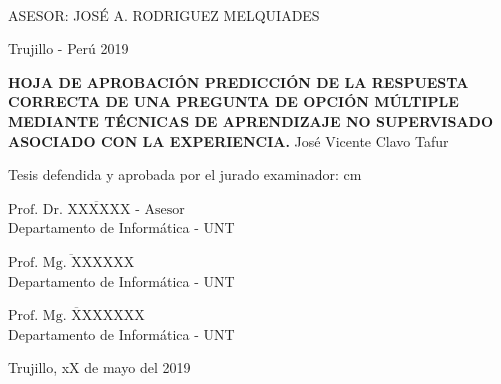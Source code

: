 \begin{center}
   {\bf {\fontsize{14}{16.8}\selectfont{José Vicente Clavo Tafur}}}\\     
   \end{center}   

\vskip 3.2cm
\begin{center}
   {\bf \doublespacing {\fontsize{17}{20.4}\selectfont{PREDICCIÓN DE LA RESPUESTA CORRECTA DE UNA PREGUNTA DE OPCIÓN MÚLTIPLE MEDIANTE TÉCNICAS DE APRENDIZAJE NO SUPERVISADO ASOCIADO CON LA EXPERIENCIA.}}}     
\end{center}   
  \vskip 2cm
\begin{verse}
 \fontsize{12}{14.4}
\end{verse}

\vskip 1.5cm 
{\fontsize{14}{16.8}\selectfont ASESOR: JOSÉ A. RODRIGUEZ MELQUIADES} 
 \vskip 1cm 
 \begin{center}    
 \vskip 2cm
{\fontsize{14}{16.8}\selectfont Trujillo - Perú
\vskip 0.2cm
\hspace*{-0.2cm} 
2019}
\end{center} 
\newpage


\begin{center}
 {\bf {\Large HOJA DE APROBACIÓN }     
 \vskip 1.5cm
  {\Large PREDICCIÓN DE LA RESPUESTA CORRECTA DE UNA PREGUNTA DE OPCIÓN MÚLTIPLE MEDIANTE TÉCNICAS DE APRENDIZAJE NO SUPERVISADO ASOCIADO CON LA EXPERIENCIA.}}
 \vskip 1cm 
  {\large{José Vicente Clavo Tafur}}\\

 \vskip 1cm
\end{center} 
Tesis defendida y aprobada por el jurado examinador:
 cm
\begin{flushleft} 
$\overline{\mbox{Prof. Dr. XXXXXX - Asesor}}$\\
\vskip -0.5cm
Departamento de Informática - UNT
\end{flushleft} 
\vskip 1cm
\begin{flushleft} 
$\overline{\mbox{Prof. Mg. XXXXXX}}$\\
\vskip -0.5cm
Departamento de Informática - UNT
\end{flushleft} 
\vskip 1cm
\begin{flushleft} 
$\overline{\mbox{Prof. Mg. XXXXXXX}}$\\
\vskip -0.5cm
Departamento de Informática - UNT
\end{flushleft}
\vskip 0.8cm 
\begin{center}    
Trujillo, xX de mayo del 2019
\end{center} 
\newpage


